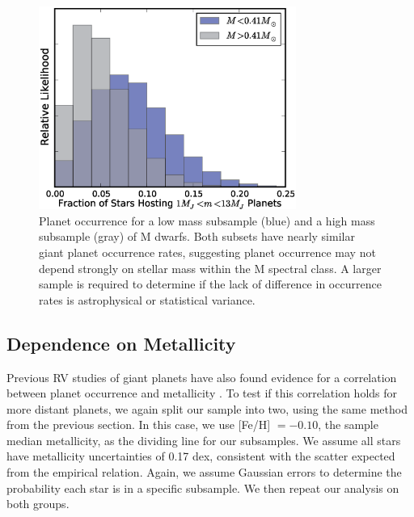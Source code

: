 \begin{figure}[htbp]
\centerline{\includegraphics[width=0.75\textwidth]{chapter3/f10.eps}}
\caption[Posterior planet occurrence for a high-mass and low-mass
subpopulation of M dwarfs]{Planet occurrence for a low mass subsample (blue) and a high mass subsample (gray) of M dwarfs. Both subsets have nearly similar giant planet occurrence rates, suggesting planet occurrence may not depend strongly on stellar mass within the M spectral class. A larger sample is required to determine if the lack of difference in occurrence rates is astrophysical or statistical variance.
  }
\label{Mass}
\end{figure}



\subsection{Dependence on Metallicity}
\label{MetalDep}
Previous RV studies of giant planets have also found evidence for a correlation between planet occurrence and metallicity \citep{Fischer05, Johnson10a}. To test if this correlation holds for more distant planets, we again split our sample into two, using the same method from the previous section. In this case, we use [Fe/H] $= -0.10$, the sample median metallicity, as the dividing line for our subsamples. We assume all stars have metallicity uncertainties of 0.17 dex, consistent with the scatter expected from the \citet{Neves12} empirical relation. Again, we assume Gaussian errors to determine the probability each star is in a specific subsample. We then repeat our analysis on both groups.

